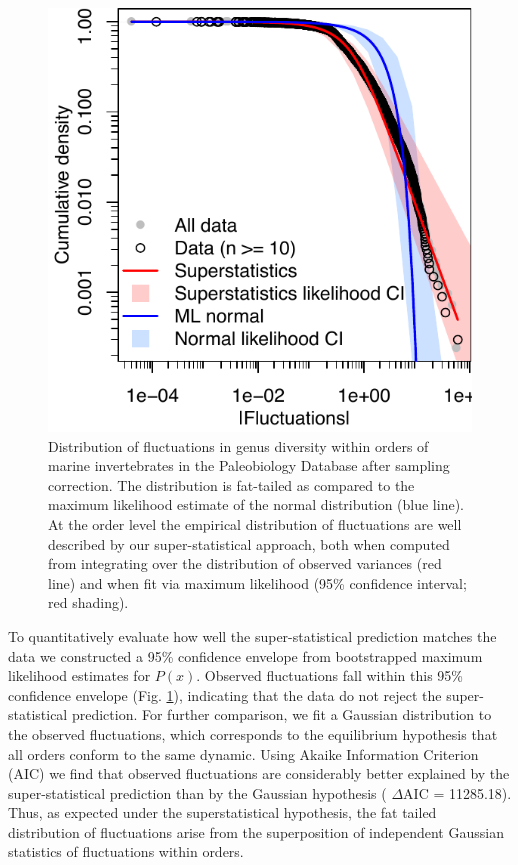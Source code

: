 \documentclass[12pt]{article}
\let\citep=\cite
\begin{document}
\begin{figure}[!h]
  \centering
  \includegraphics[scale=1]{figs/fig_Px.pdf} 
  \caption[Order-level distribution of diversity
  fluctuations]{Distribution of fluctuations in genus diversity within
    orders of marine invertebrates in the Paleobiology Database
    \citep{alroy08} after sampling correction. The distribution is
    fat-tailed as compared to the maximum likelihood estimate of the
    normal distribution (blue line).  At the order level the empirical
    distribution of fluctuations are well described by our
    super-statistical approach, both when computed from integrating
    over the distribution of observed variances (red line) and when
    fit via maximum likelihood (95\% confidence interval; red
    shading).}
  \label{fig:Px}
\end{figure}

To quantitatively evaluate how well the super-statistical prediction
matches the data we constructed a 95\% confidence envelope from
bootstrapped maximum likelihood estimates for $P(x)$. Observed
fluctuations fall within this 95\% confidence envelope
(Fig. \ref{fig:Px}), indicating that the data do not reject the
super-statistical prediction. For further comparison, we fit a
Gaussian distribution to the observed fluctuations, which corresponds
to the equilibrium hypothesis that all orders conform to the same
dynamic. Using Akaike Information Criterion (AIC) we find that
observed fluctuations are considerably better explained by the
super-statistical prediction than by the Gaussian hypothesis ({\small
  $\Delta$}AIC = 11285.18). Thus, as expected under the
superstatistical hypothesis, the fat tailed distribution of
fluctuations arise from the superposition of independent Gaussian
statistics of fluctuations within orders.
\end{document}
